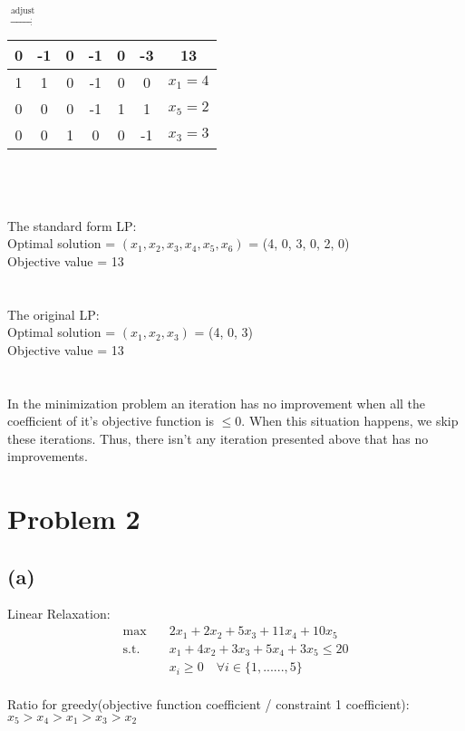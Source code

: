 \documentclass{article}
\begin{document}
$\xrightarrow{\text{adjust}}$
\begin{tabular}{cccccc|c}
0 & -1 & 0 & -1 & 0 & -3 & 13\\
\hline
1 & 1 & 0 & -1 & 0 & 0 & $x_1 = 4$\\
0 & 0 & 0 & -1 & 1 & 1 & $x_5 = 2$\\
0 & 0 & 1 & 0 & 0 & -1 & $x_3 = 3$\\
\end{tabular}
\\\\
\\The standard form LP:\\
Optimal solution = $(x_1, x_2, x_3, x_4, x_5, x_6)$ = (4, 0, 3, 0, 2, 0)\\
Objective value = 13\\
\\
\\The original LP:\\
Optimal solution = $(x_1, x_2, x_3)$ = (4, 0, 3)\\
Objective value = 13\\
\\
\\In the minimization problem an iteration has no improvement when all the coefficient of it's objective function is $\leq 0$. When this situation happens, we skip these iterations. Thus, there isn't any iteration presented above that has no improvements.

\newpage
\section{Problem 2}

\subsection{(a)}

Linear Relaxation:
\begin{equation}\label{eq:LP}\begin{split}
	\max \quad & 2x_1 + 2x_2 + 5x_3 + 11x_4 + 10x_5\\
	\mbox{s.t.} \quad 
	& x_1 + 4x_2 + 3x_3 + 5x_4 + 3x_5 \leq 20\\
	& x_i \geq 0 \quad \forall i \in \{1,......, 5\}\\
\end{split}\end{equation}
	
Ratio for greedy(objective function coefficient / constraint 1 coefficient): $x_5 > x_4 > x_1 > x_3 > x_2$\\
\end{document}
